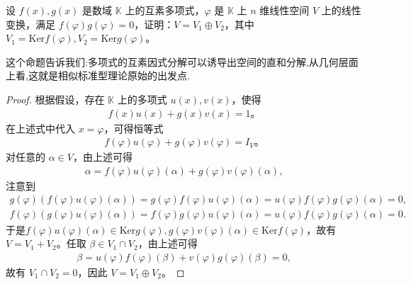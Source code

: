 \documentclass[../../main.tex]{subfiles}%
\begin{document}
\begin{proposition}\label{proposition:互素多项式诱导直和分解1}
设 $f(x), g(x)$ 是数域 $\mathbb{K}$ 上的互素多项式，$\varphi$ 是 $\mathbb{K}$ 上 $n$ 维线性空间 $V$ 上的线性变换，满足 $f(\varphi)g(\varphi) = 0$，证明：$V = V_1 \oplus V_2$，其中 $V_1 = \text{Ker} f(\varphi), V_2 = \text{Ker} g(\varphi)$。
\end{proposition}
\begin{note}
这个命题告诉我们:多项式的互素因式分解可以诱导出空间的直和分解,从几何层面上看,这就是相似标准型理论原始的出发点.
\end{note}
\begin{proof}

根据假设，存在 $\mathbb{K}$ 上的多项式 $u(x), v(x)$，使得
\begin{align*}
f(x)u(x) + g(x)v(x) = 1。
\end{align*}
在上述式中代入 $x = \varphi$，可得恒等式
\begin{align*}
f(\varphi)u(\varphi) + g(\varphi)v(\varphi) = I_V。
\end{align*}
对任意的 $\alpha \in V$，由上述可得
\begin{align*}
\alpha = f(\varphi)u(\varphi)(\alpha) + g(\varphi)v(\varphi)(\alpha),
\end{align*}
注意到 
\begin{align*}
g\left( \varphi \right) \left( f\left( \varphi \right) u\left( \varphi \right) \left( \alpha \right) \right) =g\left( \varphi \right) f\left( \varphi \right) u\left( \varphi \right) \left( \alpha \right) =u\left( \varphi \right) f\left( \varphi \right) g\left( \varphi \right) \left( \alpha \right) =0,
\\
f\left( \varphi \right) \left( g\left( \varphi \right) u\left( \varphi \right) \left( \alpha \right) \right) =f\left( \varphi \right) g\left( \varphi \right) u\left( \varphi \right) \left( \alpha \right) =u\left( \varphi \right) f\left( \varphi \right) g\left( \varphi \right) \left( \alpha \right) =0.
\end{align*}
于是$f(\varphi)u(\varphi)(\alpha) \in \text{Ker} g(\varphi), g(\varphi)v(\varphi)(\alpha) \in \text{Ker} f(\varphi)$，故有 $V = V_1 + V_2$。任取 $\beta \in V_1 \cap V_2$，由上述可得
\begin{align*}
\beta = u(\varphi)f(\varphi)(\beta) + v(\varphi)g(\varphi)(\beta) = 0,
\end{align*}
故有 $V_1 \cap V_2 = 0$，因此 $V = V_1 \oplus V_2$。     

\end{proof}
\end{document}
